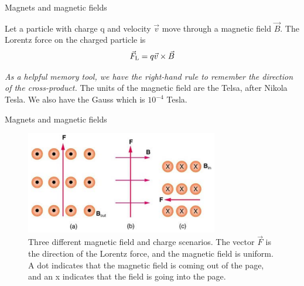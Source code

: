 \documentclass{beamer}
\begin{document}
\begin{frame}{Magnets and magnetic fields}
\begin{tcolorbox}[colback=white,colframe=black!40!black,title=The Lorentz Force]
\alert{Let a particle with charge q and velocity $\vec{v}$ move through a magnetic field $\vec{B}$. The Lorentz force on the charged particle is
\begin{equation}
\vec{F}_{\rm L} = q\vec{v} \times \vec{B}
\label{eq:Lorentz}
\end{equation}}
\end{tcolorbox}
\textit{As a helpful memory tool, we have the right-hand rule to
remember the direction of the cross-product.} The units of the
magnetic field are the Telsa, after Nikola Tesla. We also have
the Gauss which is $10^{-4}$ Tesla.
\end{frame}

\begin{frame}{Magnets and magnetic fields}
\begin{figure}
\centering
\includegraphics[width=0.75\textwidth]{figures/lorentzProblem.png}
\caption{\label{fig:lorentzProblem} Three different magnetic field and charge scenarios. The
vector $\vec{F}$ is the direction of the Lorentz force, and the magnetic field
is uniform. A dot indicates that the magnetic field is coming out of
the page, and an x indicates that the field is going into the page.}
\end{figure}
\end{frame}
\end{document}
